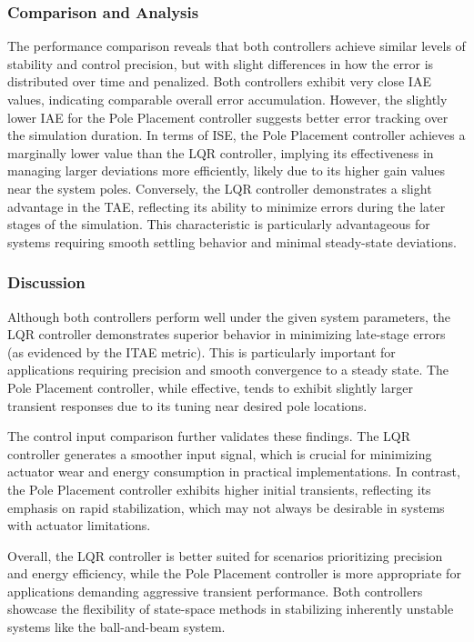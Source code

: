 \documentclass[conference]{IEEEtran}
\begin{document}
\subsubsection{Comparison and Analysis}
The performance comparison reveals that both controllers achieve similar levels of stability and control precision, but with slight differences in how the error is distributed over time and penalized. Both controllers exhibit very close IAE values, indicating comparable overall error accumulation. However, the slightly lower IAE for the Pole Placement controller suggests better error tracking over the simulation duration. In terms of ISE, the Pole Placement controller achieves a marginally lower value than the LQR controller, implying its effectiveness in managing larger deviations more efficiently, likely due to its higher gain values near the system poles. Conversely, the LQR controller demonstrates a slight advantage in the TAE, reflecting its ability to minimize errors during the later stages of the simulation. This characteristic is particularly advantageous for systems requiring smooth settling behavior and minimal steady-state deviations.


\subsubsection{Discussion}
Although both controllers perform well under the given system parameters, the LQR controller demonstrates superior behavior in minimizing late-stage errors (as evidenced by the ITAE metric). This is particularly important for applications requiring precision and smooth convergence to a steady state. The Pole Placement controller, while effective, tends to exhibit slightly larger transient responses due to its tuning near desired pole locations.

The control input comparison further validates these findings. The LQR controller generates a smoother input signal, which is crucial for minimizing actuator wear and energy consumption in practical implementations. In contrast, the Pole Placement controller exhibits higher initial transients, reflecting its emphasis on rapid stabilization, which may not always be desirable in systems with actuator limitations.

Overall, the LQR controller is better suited for scenarios prioritizing precision and energy efficiency, while the Pole Placement controller is more appropriate for applications demanding aggressive transient performance. Both controllers showcase the flexibility of state-space methods in stabilizing inherently unstable systems like the ball-and-beam system.
\end{document}

